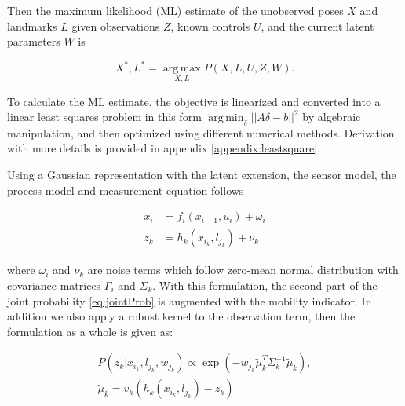 Then the maximum likelihood (ML) estimate of the unobserved poses $X$ and landmarks $L$ given observations $Z$, known controls $U$, and the current latent parameters $W$ is

\begin{equation}
X^*, L^* = \operatorname*{arg\,max}_{X,L} P(X,L,U,Z,W).
\end{equation}

To calculate the ML estimate, the objective is linearized and converted into a linear least
squares problem in this form $\operatorname*{arg\,min}_{\delta} || A
\delta  - b ||^2$ by algebraic manipulation, and then optimized using
different numerical methods. Derivation with more details is provided in appendix \ref{appendix:leastsquare}.

Using a Gaussian representation with the latent extension, the sensor
model, the process model and measurement equation follows

\begin{equation}
\begin{aligned}
x_i &= f_i(x_{i-1}, u_i) + \omega_i \\
z_k &= h_k(x_{i_k}, l_{j_k}) + \nu_k
\end{aligned}
\label{eq:gaussRepresentation}
\end{equation}

where $\omega_i$ and $\nu_k$ are noise terms which follow zero-mean normal distribution with covariance matrices $\Gamma_i$ and $\Sigma_k$. With this formulation, the second part of the joint probability \ref{eq:jointProb} is augmented with the mobility indicator. In addition we also apply a robust kernel to the observation term, then the formulation as a whole is given as:

\begin{multline}
P(z_k|x_{i_k}, l_{j_k}, w_{j_k})\propto \exp(-w_{j_k} \tilde{\mu}_k^T \Sigma_k^{-1} \tilde{\mu}_k),\\
 \tilde{\mu}_k = v_k(h_k(x_{i_k}, l_{j_k}) - z_k)
\label{eq:sensor}
\end{multline}

